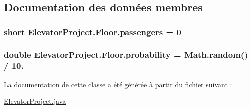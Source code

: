 \subsection{Documentation des données membres}
\hypertarget{classElevatorProject_1_1Floor_ab591e528b2bc6e951fdbf3f666faefb3}{
\subsubsection[{passengers}]{\setlength{\rightskip}{0pt plus 5cm}short Elevator\-Project.\-Floor.\-passengers = 0\hspace{0.3cm}{\ttfamily [package]}}}\label{classElevatorProject_1_1Floor_ab591e528b2bc6e951fdbf3f666faefb3}
\hypertarget{classElevatorProject_1_1Floor_a922b09a13af5c5cd50dfa2b63ef292ac}{
\subsubsection[{probability}]{\setlength{\rightskip}{0pt plus 5cm}double Elevator\-Project.\-Floor.\-probability = Math.\-random() / 10.\hspace{0.3cm}{\ttfamily [package]}}}\label{classElevatorProject_1_1Floor_a922b09a13af5c5cd50dfa2b63ef292ac}


La documentation de cette classe a été générée à partir du fichier suivant \-:\begin{DoxyCompactItemize}
\item 
\hyperlink{ElevatorProject_8java}{Elevator\-Project.\-java}\end{DoxyCompactItemize}
